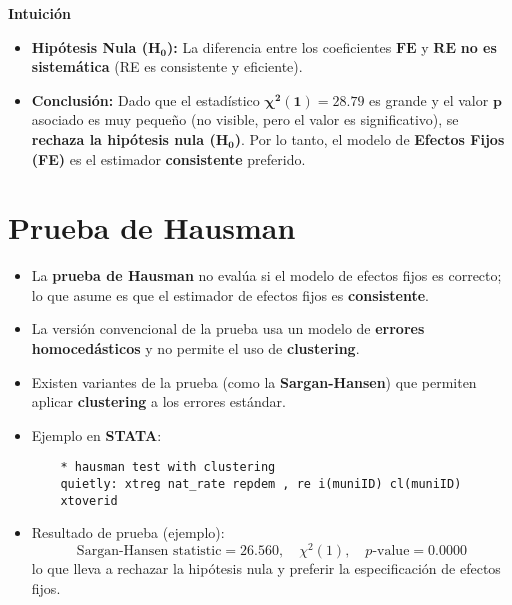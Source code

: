 \documentclass[12pt]{article}
\begin{document}
\vspace{0.3cm}

\noindent\textbf{Intuición}
\begin{itemize}
    \item \textbf{Hipótesis Nula ($\mathbf{H_0}$):} La diferencia entre los coeficientes $\mathbf{FE}$ y $\mathbf{RE}$ \textbf{no es sistemática} (RE es consistente y eficiente).
    \item \textbf{Conclusión:} Dado que el estadístico $\mathbf{\chi^2(1) = 28.79}$ es grande y el valor $\mathbf{p}$ asociado es muy pequeño (no visible, pero el valor es significativo), se \textbf{rechaza la hipótesis nula ($\mathbf{H_0}$)}. Por lo tanto, el modelo de \textbf{Efectos Fijos (FE)} es el estimador \textbf{consistente} preferido.
\end{itemize}

\section*{\noindent\textbf{Prueba de Hausman}}

\begin{itemize}
    \item La \textbf{prueba de Hausman} no evalúa si el modelo de efectos fijos es correcto; lo que asume es que el estimador de efectos fijos es \textbf{consistente}.
    
    \item La versión convencional de la prueba usa un modelo de \textbf{errores homocedásticos} y no permite el uso de \textbf{clustering}.
    
    \item Existen variantes de la prueba (como la \textbf{Sargan-Hansen}) que permiten aplicar \textbf{clustering} a los errores estándar.
    
    \item Ejemplo en \textbf{STATA}:
    \begin{verbatim}
    * hausman test with clustering
    quietly: xtreg nat_rate repdem , re i(muniID) cl(muniID)
    xtoverid
    \end{verbatim}
    
    \item Resultado de prueba (ejemplo):  
    \[
    \text{Sargan-Hansen statistic} = 26.560, \quad \chi^2(1), \quad p\text{-value} = 0.0000
    \]
    lo que lleva a rechazar la hipótesis nula y preferir la especificación de efectos fijos.
\end{itemize}
\end{document}
